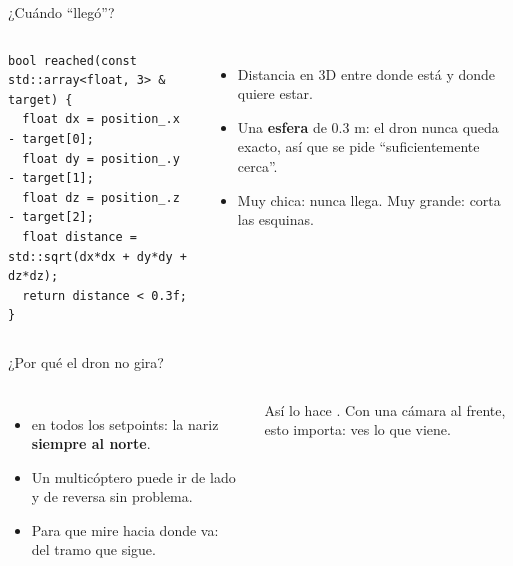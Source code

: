 \begin{frame}[fragile]{¿Cuándo ``llegó''?}
  \begin{columns}[c]
    \centering
    \begin{lstlisting}[style=cpp]
bool reached(const std::array<float, 3> & target) {
  float dx = position_.x - target[0];
  float dy = position_.y - target[1];
  float dz = position_.z - target[2];
  float distance = std::sqrt(dx*dx + dy*dy + dz*dz);
  return distance < 0.3f;
}
    \end{lstlisting}
    \small
    \begin{itemize}
      \item Distancia en 3D entre donde está y donde quiere estar.
      \item Una \textbf{esfera} de 0.3 m: el dron nunca queda exacto, así que se pide ``suficientemente
        cerca''.
      \item Muy chica: nunca llega. Muy grande: corta las esquinas.
    \end{itemize}
  \end{columns}
\end{frame}

\begin{frame}{¿Por qué el dron no gira?}
  \begin{columns}[c]
    \centering
    \small
    \begin{itemize}
      \item {} en todos los setpoints: la nariz \textbf{siempre al norte}.
      \item Un multicóptero puede ir de lado y de reversa sin problema.
      \item Para que mire hacia donde va:\\[0.2em]
         del tramo que sigue.
    \end{itemize}
    \begin{idea}
      \small Así lo hace . Con una cámara al frente, esto importa: ves lo que viene.
    \end{idea}
  \end{columns}
\end{frame}

